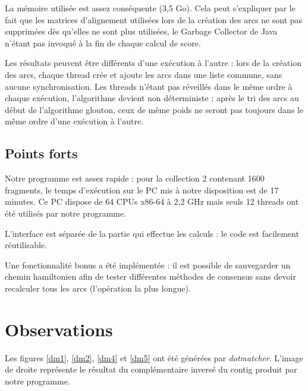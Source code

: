 \documentclass[a4paper, 12pt, titlepage]{article}
\begin{document}
La mémoire utilisée est assez conséquente (3,5 Go).
Cela peut s'expliquer par le fait que les matrices d'alignement utilisées lors
de la création des arcs ne sont pas supprimées dès qu'elles ne sont plus
utilisées, le Garbage Collector de Java n'étant pas invoqué à la fin de chaque calcul de score.

Les résultats peuvent être différents d'une exécution à l'autre :
lors de la création des arcs, chaque thread crée et ajoute les arcs
dans une liste commune, sans aucune synchronisation.
Les threads n'étant pas réveillés dans le même ordre à chaque exécution,
l'algorithme devient non déterministe : après le tri des arcs
au début de l'algorithme glouton, ceux de même poids ne seront pas
toujours dans le même ordre d'une exécution à l'autre.

\subsection*{Points forts}
Notre programme est assez rapide : pour la collection 2 contenant 1600 fragments,
le temps d'exécution sur le PC mis à notre disposition est de 17 minutes.
Ce PC dispose de 64 CPUs x86-64 à 2,2 GHz mais seuls 12 threads
ont été utilisés par notre programme.

L'interface est séparée de la partie qui effectue les calculs :
le code est facilement réutilisable.

Une fonctionnalité bonus a été implémentée : il est possible de sauvegarder
un chemin hamiltonien afin de tester différentes méthodes de consensus
sans devoir recalculer tous les arcs (l'opération la plus longue).

\newcommand{\dmscale}{0.6}
\newcommand{\incl}[2]{
\begin{figure}
 \begin{minipage}[c]{.47\linewidth}
  \texttt{[image: figures/dotmatcherc\#1.png]}
 \end{minipage}
 \begin{minipage}[c]{.47\linewidth}
  \texttt{[image: figures/dotmatcherc\#1r.png]}
 \end{minipage} 
 \caption{Résultat de la collection #1}
 \label{dm#1}
\end{figure}
}

\section{Observations}
Les figures \ref{dm1}, \ref{dm2}, \ref{dm4} et \ref{dm5} ont été générées par \emph{dotmatcher}.
L'image de droite représente le résultat du complémentaire inversé du contig produit par notre programme.
\end{document}
